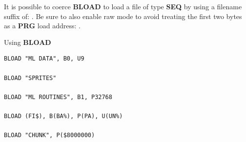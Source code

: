 \begin{description}[leftmargin=2cm,style=nextline]
                  It is possible to coerce {\bf BLOAD} to load a file of type {\bf SEQ} by using a filename suffix of: . Be sure to also enable raw mode to avoid treating the first two bytes as a {\bf PRG} load address: .

\item [Examples:] Using {\bf BLOAD}

\begin{tcolorbox}[colback=black,coltext=white]
\verbatimfont{\codefont}
\begin{verbatim}
BLOAD "ML DATA", B0, U9

BLOAD "SPRITES"

BLOAD "ML ROUTINES", B1, P32768

BLOAD (FI$), B(BA%), P(PA), U(UN%)

BLOAD "CHUNK", P($8000000)
\end{verbatim}
\end{tcolorbox}
\end{description}


\newpage
